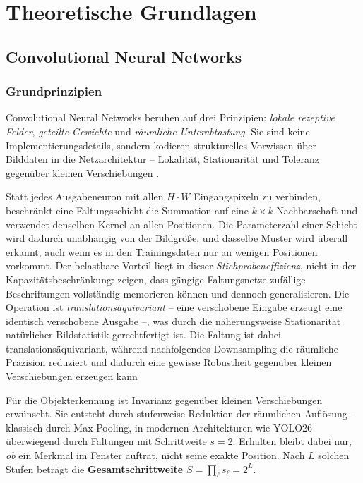 \chapter{Theoretische Grundlagen}
\label{kap:theorie}

\section{Convolutional Neural Networks}
\label{sec:cnn}

\subsection{Grundprinzipien}
\label{sec:prinzipien}

Convolutional Neural Networks beruhen auf drei Prinzipien: \emph{lokale
rezeptive Felder}, \emph{geteilte Gewichte} und \emph{räumliche
Unterabtastung}. Sie sind keine Implementierungsdetails, sondern kodieren
strukturelles Vorwissen über Bilddaten in die Netzarchitektur -- Lokalität,
Stationarität und Toleranz gegenüber kleinen Verschiebungen
\parencite{lecun1998,goodfellow2016}.

 Statt jedes
Ausgabeneuron mit allen $H \cdot W$ Eingangspixeln zu verbinden, beschränkt eine
Faltungsschicht die Summation auf eine $k \times k$-Nachbarschaft und verwendet
denselben Kernel an allen Positionen. Die Parameterzahl einer Schicht wird
dadurch unabhängig von der Bildgröße, und dasselbe Muster wird überall erkannt,
auch wenn es in den Trainingsdaten nur an wenigen Positionen vorkommt. Der
belastbare Vorteil liegt in dieser \emph{Stichprobeneffizienz}, nicht in der
Kapazitätsbeschränkung: \textcite{zhang2017rethinking} zeigen, dass gängige
Faltungsnetze zufällige Beschriftungen vollständig memorieren können und dennoch
generalisieren. Die Operation ist \emph{translationsäquivariant} -- eine
verschobene Eingabe erzeugt eine identisch verschobene Ausgabe --, was durch die
näherungsweise Stationarität natürlicher Bildstatistik gerechtfertigt ist. Die Faltung
 ist dabei translationsäquivariant, während nachfolgendes Downsampling die räumliche
 Präzision reduziert und dadurch eine gewisse Robustheit gegenüber kleinen Verschiebungen 
 erzeugen kann

 Für
die Objekterkennung ist Invarianz gegenüber kleinen Verschiebungen erwünscht.
Sie entsteht durch stufenweise Reduktion der räumlichen Auflösung -- klassisch
durch Max-Pooling, in modernen Architekturen wie YOLO26 überwiegend durch
Faltungen mit Schrittweite $s = 2$. Erhalten bleibt dabei nur, \emph{ob} ein
Merkmal im Fenster auftrat, nicht seine exakte Position. Nach $L$ solchen Stufen
beträgt die \textbf{Gesamtschrittweite} $S = \prod_\ell s_\ell = 2^L$.

